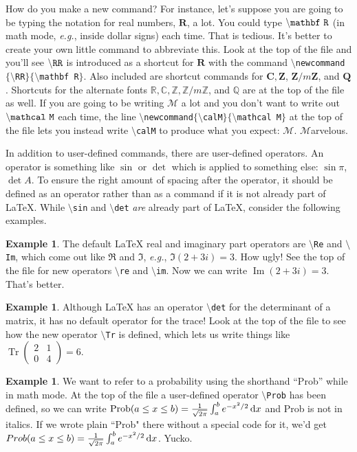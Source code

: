 \documentclass[12pt,letterpaper]{amsart}
\newcommand{\RR}{\mathbf R}
\newcommand{\CC}{\mathbf C}
\newcommand{\ZZ}{\mathbf Z}
\newcommand{\ZZn}[1]{\ZZ/{#1}\ZZ}
\newcommand{\QQ}{\mathbf Q}
\newcommand{\rr}{\mathbb R}
\newcommand{\cc}{\mathbb C}
\newcommand{\zz}{\mathbb Z}
\newcommand{\zzn}[1]{\zz/{#1}\zz}
\newcommand{\qq}{\mathbb Q}
\newcommand{\calM}{\mathcal M}
\newcommand{\latex}{\LaTeX}
\newcommand{\dd}{{\rm d}}
\newcommand{\sm}{\setminus}
\newcommand{\pln}[1]{$\sm${\tt #1}}
\newcommand{\Tr}{\operatorname {Tr}}
\newcommand{\Prob}{\operatorname {Prob}}
\newcommand{\im}{\operatorname {Im}}
\theoremstyle{plain}
\theoremstyle{definition}
\newtheorem{example}[theorem]{Example}
\numberwithin{equation}{section}
\begin{document}
How do you make a new command?  For instance, 
let's suppose you are going to be typing 
the notation for real numbers, $\RR$, a lot.  
You could type $\tt {\sm}mathbf \ R$ 
(in math mode, {\it e.g.}, inside dollar signs) 
each time.  That is tedious.  It's better to 
create your own little command to abbreviate this. 
Look at the top of the file and you'll see 
$\tt {\sm}RR$ is introduced as a shortcut for $\RR$ 
with the command 
{\tt $\sm$newcommand$\{\sm$RR$\}\{\sm$mathbf R$\}$}. 
Also included are
shortcut commands for $\CC, \ZZ$, $\ZZn{m}$, and $\QQ$. 
Shortcuts for the alternate fonts 
$\rr, \cc, \zz, \zzn{m}$, and $\qq$ are at the top of the file as well. 
If you are going to be writing $\mathcal M$ a  
lot and you don't want to write out $\tt {\sm}mathcal \ M$
each time, 
the line 
{\tt $\sm$newcommand$\{\sm$calM$\}\{\sm$mathcal M$\}$}
at the top of the file 
lets you instead write 
{\tt $\sm$calM} to produce 
what you expect: $\calM$.  $\calM$arvelous.



In addition to user-defined commands, there are 
user-defined operators. An operator is something 
like $\sin$ or $\det$ which 
is applied to something else: $\sin \pi$, 
$\det A$. To ensure the right amount of spacing 
after the operator, it should be defined as an operator 
rather than as a command if it is not already part of \latex.
While {\tt $\sm$sin} and {\tt $\sm$det} {\it are} already part of \latex{}, 
consider the following examples.

\begin{example}
The default \latex{} real and imaginary part operators 
are 
\pln{Re} and \pln{Im}, 
which come out like 
$\Re$ and $\Im$, {\it e.g.}, $\Im(2+3i) = 3$.  How ugly!  
See the top of the file for new operators 
\pln{re} and \pln{im}. 
Now we can write $\im(2+3i) = 3$.  That's better.
\end{example}

\begin{example}
Although 
\latex{} has an operator 
\pln{det} 
for the determinant of a matrix, 
it has no default operator for the trace! 
Look at the top of the file to see how the new operator 
\pln{Tr} is defined, which lets us write things like 
$\Tr (\begin{smallmatrix}2&1\\0&4\end{smallmatrix}) = 6$.
\end{example}


\begin{example}
We want to refer to a probability using the shorthand ``Prob'' 
while in math mode.  At the top of the file a user-defined 
operator 
\pln{Prob} 
has been defined, so we can write 
$\Prob(a \leq x \leq b) = \frac{1}{\sqrt{2\pi}}\int_a^b e^{-x^2/2}\,\dd{x}$ 
and Prob is not in italics.  If we wrote plain ``Prob" there 
without a special code for it, we'd get
$Prob(a \leq x \leq b) = \frac{1}{\sqrt{2\pi}}\int_a^b e^{-x^2/2}\,\dd{x}$. 
Yucko.
\end{example}
\end{document}
